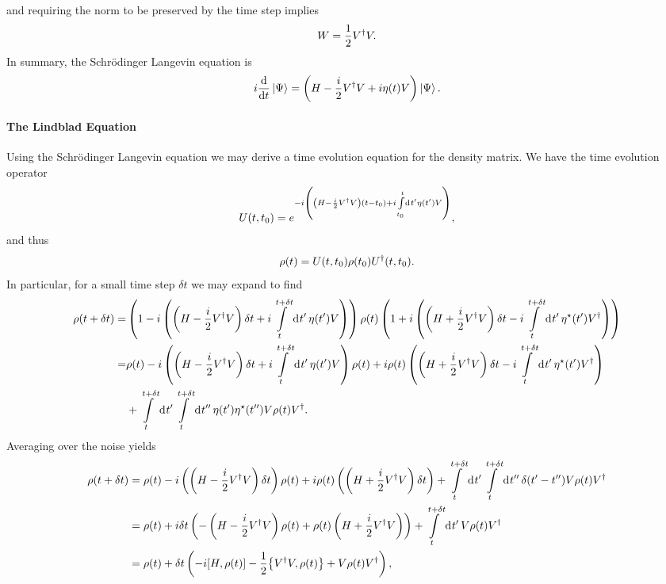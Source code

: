 and requiring the norm to be preserved by the time step implies
\begin{align*}
	W = \frac{1}{2}V^{\dagger} V.
\end{align*}
In summary, the Schrödinger Langevin equation is
\begin{align*}
	i\dv{t}\ket{\Psi} = \left(H - \frac{i}{2}V^{\dagger} V + i\eta(t)V\right)\ket{\Psi}.
\end{align*}

\paragraph{The Lindblad Equation}
Using the Schrödinger Langevin equation we may derive a time evolution equation for the density matrix. We have the time evolution operator
\begin{align*}
	U(t, t_{0}) = e^{-i\left(\left(H - \frac{i}{2}V^{\dagger} V\right)(t - t_{0}) + i\int\limits_{t_{0}}^{t}\dd[]{t\ensuremath{^{\prime}}}\eta(t^{\prime})V\right)},
\end{align*}
and thus
\begin{align*}
	\rho(t) = U(t, t_{0})\rho(t_{0})U^{\dagger}(t, t_{0}).
\end{align*}
In particular, for a small time step $\delta t$ we may expand to find
\begin{align*}
	\rho(t + \delta t) =& \left(1 - i\left(\left(H - \frac{i}{2}V^{\dagger} V\right)\delta t + i\int\limits_{t}^{t + \delta t}\dd[]{t\ensuremath{^{\prime}}}\eta(t^{\prime})V\right)\right)\rho(t)\left(1 + i\left(\left(H + \frac{i}{2}V^{\dagger} V\right)\delta t - i\int\limits_{t}^{t + \delta t}\dd[]{t\ensuremath{^{\prime}}}\eta^{\star}(t^{\prime})V^{\dagger}\right)\right) \\
	                   =& \rho(t) - i\left(\left(H - \frac{i}{2}V^{\dagger} V\right)\delta t + i\int\limits_{t}^{t + \delta t}\dd[]{t\ensuremath{^{\prime}}}\eta(t^{\prime})V\right)\rho(t) + i\rho(t)\left(\left(H + \frac{i}{2}V^{\dagger} V\right)\delta t - i\int\limits_{t}^{t + \delta t}\dd[]{t\ensuremath{^{\prime}}}\eta^{\star}(t^{\prime})V^{\dagger}\right) \\
	                    &+ \int\limits_{t}^{t + \delta t}\dd[]{t\ensuremath{^{\prime}}}\int\limits_{t}^{t + \delta t}\dd[]{t^{\prime\prime}}\eta(t^{\prime})\eta^{\star}(t^{\prime\prime})V\rho(t)V^{\dagger}.
\end{align*}
Averaging over the noise yields
\begin{align*}
	\rho(t + \delta t) &= \rho(t) - i\left(\left(H - \frac{i}{2}V\adj V\right)\delta t\right)\rho(t) + i\rho(t)\left(\left(H + \frac{i}{2}V\adj V\right)\delta t\right) + \integ{t}{t + \delta t}{t\p}{\integ{t}{t + \delta t}{t^{\prime\prime}}{\delta(t\p - t^{\prime\prime})V\rho(t)V\adj}} \\
	                   &= \rho(t) + i\delta t\left(-\left(H - \frac{i}{2}V\adj V\right)\rho(t) + \rho(t)\left(H + \frac{i}{2}V\adj V\right)\right) + \integ{t}{t + \delta t}{t\p}{V\rho(t)V\adj} \\
	                   &= \rho(t) + \delta t\left(-i\comm{H}{\rho(t)} - \frac{1}{2}\acomm{V\adj V}{\rho(t)} + V\rho(t)V\adj\right),
\end{align*}

